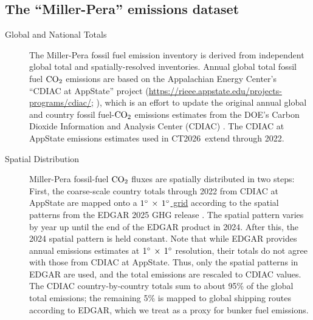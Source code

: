 \documentclass[11pt,openany]{book}
\newcommand\ctver{CT2026}
\begin{document}
\subsection{The ``Miller-Pera'' emissions dataset}\label{sec:ff_miller}

\begin{description}
\item[Global and National Totals]  The Miller-Pera fossil fuel emission
  inventory \citep{pera26a} is derived from independent global total and
  spatially-resolved inventories.  Annual global total fossil fuel
  $\text{CO}_{2}$ emissions are based on the Appalachian Energy Center’s
  “CDIAC at AppState” project
  (\href{https://rieee.appstate.edu/projects-programs/cdiac/}{https://rieee.appstate.edu/projects-programs/cdiac/};
  \citealp{erb26a}),
  which is an effort to update the original annual global and country
  fossil fuel-$\text{CO}_{2}$ emissions estimates from the DOE’s Carbon Dioxide
  Information and Analysis Center (CDIAC) \citep{boden17a}. The
  CDIAC at AppState emissions estimates used in \ctver\ extend through
  2022.

\item[Spatial Distribution] Miller-Pera fossil-fuel $\text{CO}_{2}$ fluxes are
  spatially distributed in two steps: First, the coarse-scale country
  totals through 2022 from CDIAC at AppState are mapped onto a
  \href{http://data.giss.nasa.gov/landuse/country.html}{$1^{\circ}\,\times\,1^{\circ}$
    grid} according to the spatial patterns from the EDGAR 2025 GHG
  release \citep{crippa25a}. The spatial pattern varies
  by year up until the end of the EDGAR product in 2024.  After
  this, the 2024 spatial pattern is held constant.
  Note that while EDGAR provides annual emissions estimates at
  $1^{\circ}\,\times\,1^{\circ}$ resolution, their totals do not agree with those from
  CDIAC at AppState. Thus, only the spatial patterns in EDGAR are
  used, and the total emissions are rescaled to CDIAC values.
  The CDIAC country-by-country totals sum to about 95\% of the
  global total emissions; the remaining 5\% is mapped to global
  shipping routes according to EDGAR, which we treat as a proxy for
  bunker fuel emissions.


\end{description}
\end{document}
